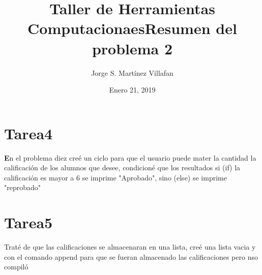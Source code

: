\documentclass[letterpaper, 12pt, oneside]{article}%
\title{\Huge Taller de Herramientas Computacionaes}
\author{Jorge S. Martínez Villafan}
\date{Enero 21, 2019}
\begin{document}
\maketitle
\newpage
\title{Resumen del problema 2}
\section{Tarea4}
\textbf En el problema diez creé un ciclo para que el usuario puede mater la cantidad la calificación de los alumnos que desee, condicioné que los resultados si (if) la calificación es mayor a 6 se imprime "Aprobado", sino (else) se imprime "reprobado"
\section{Tarea5}
Traté de que las calificaciones se almacenaran en una lista, creé una lista vacia y con el comando append para que se fueran almacenado las calificaciones pero nso compiló
\end{document}
